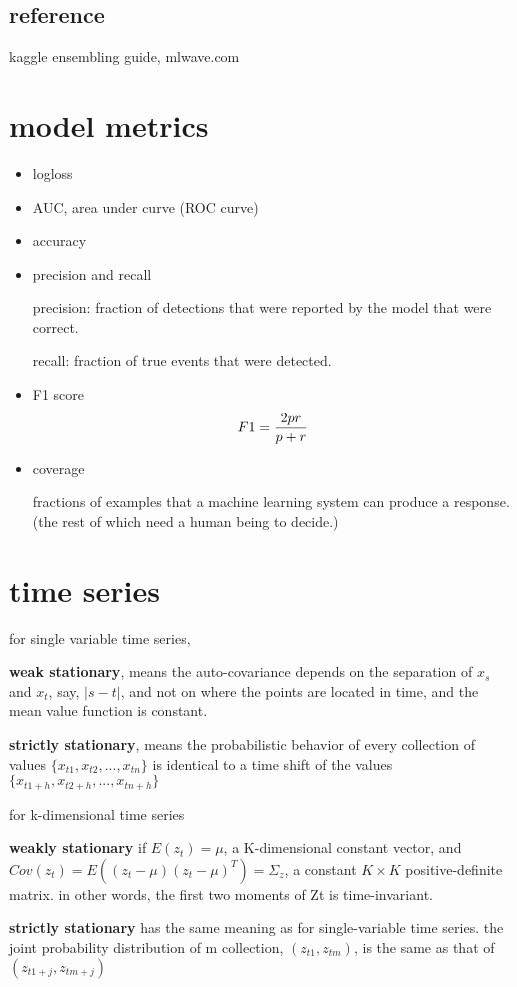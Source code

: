 \documentclass[10pt,a4paper]{book}
\begin{document}
\subsection{reference}
	kaggle ensembling guide, mlwave.com
\section {model metrics}
	\begin{itemize}
		\item logloss
		\item AUC, area under curve (ROC curve)
		\item accuracy
		\item precision and recall
		
		precision: fraction of detections that were reported by the model that were correct.

		recall: fraction of true events that were detected.
		
		\item F1 score 
		$$ F1 = {2pr\over {p+r}} $$
		\item coverage
		
		fractions of examples that a machine learning system can produce a response. (the rest of which need a human being to decide.)
	\end{itemize}
	
\section {time series}

for single variable time series,

\textbf{weak stationary}, means the auto-covariance depends on the separation of $x_s$ and $x_t$, say, $\vert s-t \vert$, and not on where the points are located in time, and the mean value function is constant.

\textbf{strictly stationary}, means the probabilistic behavior of every collection of values $\{x_{t1}, x_{t2}, ..., x_{tn}\}$ is identical to a time shift of the values $\{x_{t1+h}, x_{t2+h}, ..., x_{tn+h}\}$

for k-dimensional time series

\textbf{weakly stationary} if $E(z_t) = \mu$, a K-dimensional constant vector, and $Cov(z_t) = E((z_t-\mu)(z_t-\mu)^T) = \Sigma_z$, a constant $K \times K$ positive-definite matrix. in other words, the first two moments of Zt is time-invariant.

\textbf{strictly stationary} has the same meaning as for single-variable time series. the joint probability distribution of m collection, $(z_{t1}, z_{tm})$, is the same as that of $(z_{t1+j}, z_{tm+j})$
\end{document}

